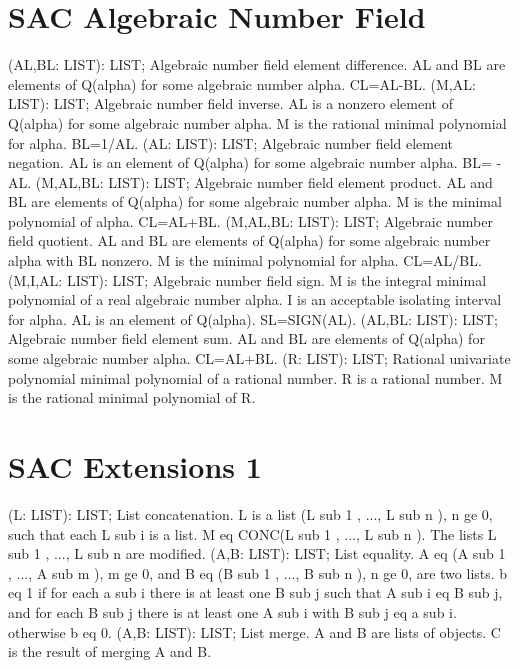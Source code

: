 \section{ SAC Algebraic Number Field  } 
 (AL,BL: LIST): LIST; \eproc
\bcom Algebraic number field element difference. AL and BL are elements
of Q(alpha) for some algebraic number alpha. CL=AL-BL. \ecom 
{} (M,AL: LIST): LIST; \eproc
\bcom Algebraic number field inverse. AL is a nonzero
element of Q(alpha) for some algebraic number alpha.  M is the
rational minimal polynomial for alpha. BL=1/AL. \ecom 
{} (AL: LIST): LIST; \eproc
\bcom Algebraic number field element negation. AL is an element of
Q(alpha) for some algebraic number alpha. BL= -AL. \ecom 
{} (M,AL,BL: LIST): LIST; \eproc
\bcom Algebraic number field element product. AL and BL are elements of
Q(alpha) for some algebraic number alpha.  M is the minimal polynomial
of alpha. CL=AL+BL. \ecom 
{} (M,AL,BL: LIST): LIST; \eproc
\bcom Algebraic number field quotient. AL and BL are
elements of Q(alpha) for some algebraic number alpha with BL
nonzero. M is the minimal polynomial for alpha. CL=AL/BL. \ecom 
{} (M,I,AL: LIST): LIST; \eproc
\bcom Algebraic number field sign. M is the integral minimal polynomial
of a real algebraic number alpha.  I is an acceptable isolating
interval for alpha. AL is an element of Q(alpha). SL=SIGN(AL). \ecom 
{} (AL,BL: LIST): LIST; \eproc
\bcom Algebraic number field element sum. AL and BL are elements of
Q(alpha) for some algebraic number alpha. CL=AL+BL. \ecom 
{} (R: LIST): LIST; \eproc
\bcom Rational univariate polynomial minimal polynomial of a rational number.
R is a rational number. M is the rational minimal polynomial of R. \ecom 
\section{ SAC Extensions 1  } 
 (L: LIST): LIST; \eproc
\bcom List concatenation. L is a list (L sub 1 , ..., L sub n ),
n ge 0, such that each L sub i is a list.  M eq CONC(L sub 1 , ...,
L sub n ). The lists L sub 1 , ..., L sub n are modified. \ecom 
{} (A,B: LIST): LIST; \eproc
\bcom List equality. A eq (A sub 1 , ..., A sub m ), m ge 0, and
B eq (B sub 1 , ..., B sub n ), n ge 0, are two lists.  b eq 1 if
for each a sub i there is at least one B sub j such that
A sub i eq B sub j, and for each B sub j there is at least
one A sub i with B sub j eq a sub i. otherwise b eq 0. \ecom 
{} (A,B: LIST): LIST; \eproc
\bcom List merge. A and B are lists of objects. C is the result of
merging A and B. \ecom 
